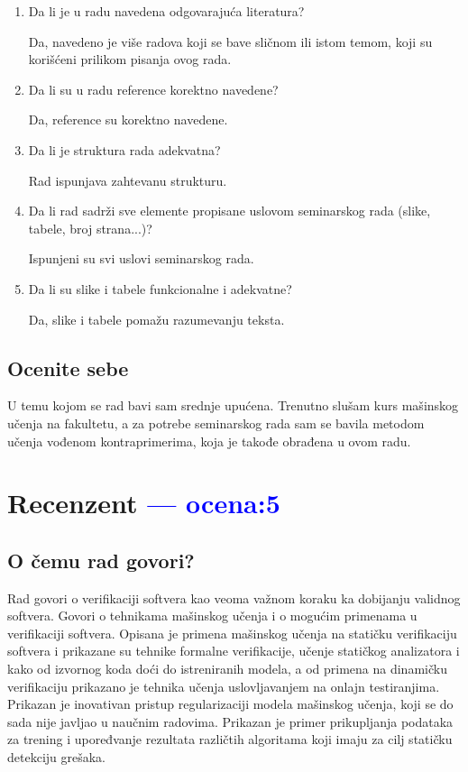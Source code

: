 \documentclass[a4paper]{report}
\newcommand{\odgovor}[1]{\textcolor{blue}{#1}}
\begin{document}
\begin{enumerate}
\item Da li je u radu navedena odgovarajuća literatura?

Da, navedeno je više radova koji se bave sličnom ili istom temom, koji su korišćeni prilikom pisanja ovog rada.

\item Da li su u radu reference korektno navedene?

Da, reference su korektno navedene.

\item Da li je struktura rada adekvatna?

Rad ispunjava zahtevanu strukturu.

\item Da li rad sadrži sve elemente propisane uslovom seminarskog rada (slike, tabele, broj strana...)?

Ispunjeni su svi uslovi seminarskog rada.

\item Da li su slike i tabele funkcionalne i adekvatne?

Da, slike i tabele pomažu razumevanju teksta.

\end{enumerate}

\section{Ocenite sebe}

U temu kojom se rad bavi sam srednje upućena. Trenutno slušam kurs mašinskog učenja na fakultetu, a za potrebe seminarskog rada sam se bavila metodom učenja vođenom kontraprimerima, koja je takođe obrađena u ovom radu.


\chapter{Recenzent \odgovor{--- ocena:5} }


\section{O čemu rad govori?}
Rad govori o verifikaciji softvera kao veoma važnom koraku ka dobijanju validnog softvera.
Govori o tehnikama mašinskog učenja i o mogućim primenama u verifikaciji softvera.
Opisana je primena mašinskog učenja na statičku verifikaciju softvera i prikazane su
tehnike formalne verifikacije, učenje statičkog analizatora i kako
od izvornog koda doći do istreniranih modela, a od primena na dinamičku
verifikaciju prikazano je tehnika učenja uslovljavanjem na onlajn testiranjima.
Prikazan je inovativan pristup regularizaciji modela mašinskog učenja, koji se do sada nije javljao
u naučnim radovima.
Prikazan je primer prikupljanja podataka za trening i upoređvanje rezultata različtih algoritama koji imaju za cilj
statičku detekciju grešaka.
\end{document}
